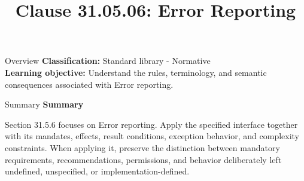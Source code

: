 \documentclass[10pt,letterpaper]{article}
\title{Clause 31.05.06: Error Reporting}
\author{}
\date{}
\begin{document}
\maketitle
\begin{CornellOverviewBox}{Overview}
\textbf{Classification:} Standard library - Normative\\[2pt]
\textbf{Learning objective:} Understand the rules, terminology, and semantic consequences associated with Error reporting.
\end{CornellOverviewBox}\begin{CornellSummaryBox}{Summary}
{\sffamily\bfseries\color{Accent} Summary}\par\vspace{3pt}Section 31.5.6 focuses on Error reporting. Apply the specified interface together with its mandates, effects, result conditions, exception behavior, and complexity constraints. When applying it, preserve the distinction between mandatory requirements, recommendations, permissions, and behavior deliberately left undefined, unspecified, or implementation-defined.
\end{CornellSummaryBox}
\end{document}
